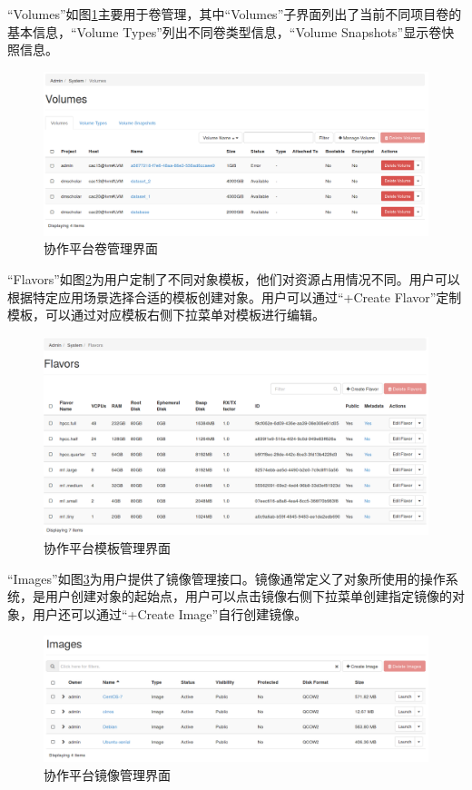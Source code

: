 \documentclass[12pt]{ctexart}%
\begin{document}
``Volumes''如图\ref{fig:adminsystemvolumes}主要用于卷管理，其中``Volumes''子界面列出了当前不同项目卷的基本信息，``Volume Types''列出不同卷类型信息，``Volume Snapshots''显示卷快照信息。
\begin{figure}[!htb]
\centering
\includegraphics[width=6in]{./figures/Admin_System_Volumes}
\caption{协作平台卷管理界面}
\label{fig:adminsystemvolumes}
\end{figure}
``Flavors''如图\ref{fig:adminsystemflavors}为用户定制了不同对象模板，他们对资源占用情况不同。用户可以根据特定应用场景选择合适的模板创建对象。用户可以通过``+Create Flavor''定制模板，可以通过对应模板右侧下拉菜单对模板进行编辑。
\begin{figure}[!htb]
\centering
\includegraphics[width=6in]{./figures/Admin_System_Flavors}
\caption{协作平台模板管理界面}
\label{fig:adminsystemflavors}
\end{figure}
``Images''如图\ref{fig:adminsystemimages}为用户提供了镜像管理接口。镜像通常定义了对象所使用的操作系统，是用户创建对象的起始点，用户可以点击镜像右侧下拉菜单创建指定镜像的对象，用户还可以通过``+Create Image''自行创建镜像。
\begin{figure}[!htb]
\centering
\includegraphics[width=6in]{./figures/Admin_System_Images}
\caption{协作平台镜像管理界面}
\label{fig:adminsystemimages}
\end{figure}
\end{document}
